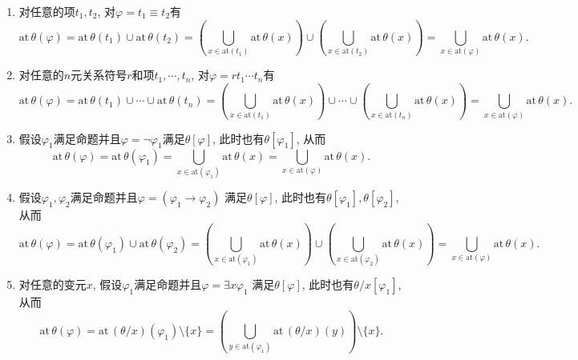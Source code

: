 \begin{enumerate}
    \item 对任意的项$t_1,t_2$, 对$\varphi=t_1\equiv t_2$有
    \[
        \mathrm{at}\,\theta(\varphi)=
        \mathrm{at}\,\theta(t_1)\cup\mathrm{at}\,\theta(t_2)=
        \left(\bigcup_{x\in\mathrm{at}(t_1)}\mathrm{at}\,\theta(x)\right)\cup
        \left(\bigcup_{x\in\mathrm{at}(t_2)}\mathrm{at}\,\theta(x)\right)=
        \bigcup_{x\in\mathrm{at}(\varphi)}\mathrm{at}\,\theta(x).
    \]

    \vspace{3pt}
    \item 对任意的$n$元关系符号$r$和项$t_1,\cdots,t_n$, 对$\varphi=rt_1\cdots t_n$有
    \vspace{3pt}
    \[
        \mathrm{at}\,\theta(\varphi)=
        \mathrm{at}\,\theta(t_1)\cup\cdots\cup\mathrm{at}\,\theta(t_n)=
        \left(\bigcup_{x\in\mathrm{at}(t_1)}\mathrm{at}\,\theta(x)\right)\cup\cdots
        \cup\left(\bigcup_{x\in\mathrm{at}(t_n)}\mathrm{at}\,\theta(x)\right)=
        \bigcup_{x\in\mathrm{at}(\varphi)}\mathrm{at}\,\theta(x).
    \]
    
    \vspace{3pt}
    \item 假设$\varphi_1$满足命题并且$\varphi=\neg\varphi_1$满足$\theta[\varphi]$,
    此时也有$\theta[\varphi_1]$, 从而
    \vspace{3pt}
    \[
        \mathrm{at}\,\theta(\varphi)=\mathrm{at}\,\theta(\varphi_1)=
        \bigcup_{x\in\mathrm{at}(\varphi_1)}\mathrm{at}\,\theta(x)=
        \bigcup_{x\in\mathrm{at}(\varphi)}\mathrm{at}\,\theta(x).
    \]

    \vspace{3pt}
    \item 假设$\varphi_1,\varphi_2$满足命题并且$\varphi=(\varphi_1\to\varphi_2)$
    满足$\theta[\varphi]$, 此时也有$\theta[\varphi_1],\theta[\varphi_2]$, 从而
    \[
        \mathrm{at}\,\theta(\varphi)=
        \mathrm{at}\,\theta(\varphi_1)\cup\mathrm{at}\,\theta(\varphi_2)=
        \left(\bigcup_{x\in\mathrm{at}(\varphi_1)}\mathrm{at}\,\theta(x)\right)\cup
        \left(\bigcup_{x\in\mathrm{at}(\varphi_2)}\mathrm{at}\,\theta(x)\right)=
        \bigcup_{x\in\mathrm{at}(\varphi)}\mathrm{at}\,\theta(x).
    \]

    \vspace{3pt}
    \item 对任意的变元$x$, 假设$\varphi_1$满足命题并且$\varphi=\exists x\varphi_1$
    满足$\theta[\varphi]$, 此时也有$\theta/x[\varphi_1]$, 从而
    \[
        \mathrm{at}\,\theta(\varphi)=
        \mathrm{at}\,(\theta/x)(\varphi_1)\setminus\{x\}=
        \left(\bigcup_{y\in\mathrm{at}(\varphi_1)}\mathrm{at}\,(\theta/x)(y)\right)
        \setminus\{x\}.
    \]


\end{enumerate}
